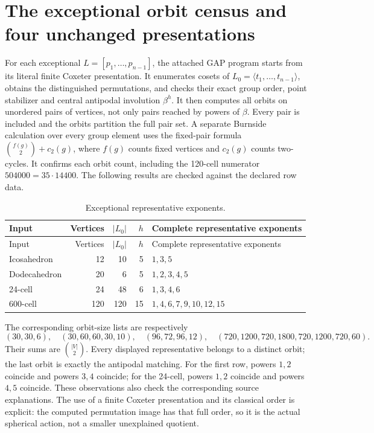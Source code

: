 \section{The exceptional orbit census and four unchanged presentations}\label{the-exceptional-orbit-census-and-four-unchanged-presentations}

For each exceptional \(L=[p_1,\ldots,p_{n-1}]\), the attached GAP program starts from its literal finite Coxeter presentation. It enumerates cosets of \(L_0=\langle t_1,\ldots,t_{n-1}\rangle\), obtains the distinguished permutations, and checks their exact group order, point stabilizer and central antipodal involution \(\beta^h\). It then computes all orbits on unordered pairs of vertices, not only pairs reached by powers of \(\beta\). Every pair is included and the orbits partition the full pair set. A separate Burnside calculation over every group element uses the fixed-pair formula \(\binom{f(g)}2+c_2(g)\), where \(f(g)\) counts fixed vertices and \(c_2(g)\) counts two-cycles. It confirms each orbit count, including the 120-cell numerator \(504000=35\cdot14400\). The following results are checked against the declared row data.

\begin{longtable}{@{}lrrrp{57mm}@{}}
\caption{Exceptional representative exponents.}\tabularnewline
\toprule\noalign{}
Input & Vertices & \(|L_0|\) & \(h\) & Complete representative exponents \\
\midrule\noalign{}
\endfirsthead
\toprule\noalign{}
Input & Vertices & \(|L_0|\) & \(h\) & Complete representative exponents \\
\midrule\noalign{}
\endhead
\bottomrule\noalign{}
\endlastfoot
Icosahedron & 12 & 10 & 5 & \(1,3,5\) \\
Dodecahedron & 20 & 6 & 5 & \(1,2,3,4,5\) \\
24-cell & 24 & 48 & 6 & \(1,3,4,6\) \\
600-cell & 120 & 120 & 15 & \(1,4,6,7,9,10,12,15\) \\
\end{longtable}

The corresponding orbit-size lists are respectively
\[
 (30,30,6),\quad (30,60,60,30,10),\quad
 (96,72,96,12),\quad
 (720,1200,720,1800,720,1200,720,60).
\]
Their sums are \(\binom{|V|}{2}\). Every displayed representative belongs to a distinct orbit; the last orbit is exactly the antipodal matching. For the first row, powers \(1,2\) coincide and powers \(3,4\) coincide; for the 24-cell, powers \(1,2\) coincide and powers \(4,5\) coincide. These observations also check the corresponding source explanations. The use of a finite Coxeter presentation and its classical order is explicit: the computed permutation image has that full order, so it is the actual spherical action, not a smaller unexplained quotient.

